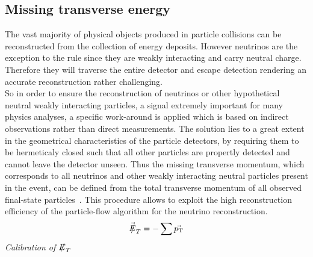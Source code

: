 \subsection{Missing transverse energy}\label{subsec::MET}

The vast majority of physical objects produced in particle collisions can be reconstructed from the collection of energy deposits. 
However neutrinos are the exception to the rule since they are weakly interacting and carry neutral charge. Therefore they will traverse the entire detector and escape detection rendering an accurate reconstruction rather challenging.
\\
So in order to ensure the reconstruction of neutrinos or other hypothetical neutral weakly interacting particles, a signal extremely important for many physics analyses, a specific work-around is applied which is based on indirect observations rather than direct measurements. The solution lies to a great extent in the geometrical characteristics of the particle detectors, by requiring them to be hermeticaly closed such that all other particles are propertly detected and cannot leave the detector unseen.
Thus the missing transverse momentum, which corresponds to all neutrinos and other weakly interacting neutral particles present in the event, can be defined from the total transverse momentum of all observed final-state particles~\cite{}. This procedure allows to exploit the high reconstruction efficiency of the particle-flow algorithm for the neutrino reconstruction.
\begin{equation}
 \vecmet = - \sum \vec{\pT}
\end{equation}
\textit{Calibration of $\met$}
